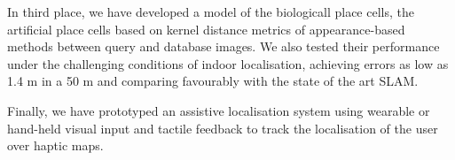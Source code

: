 In third place, we have developed a model of the biologicall place cells, the artificial place cells based on kernel distance metrics of appearance-based methods between query and database images. We also tested their performance under the challenging conditions of indoor localisation, achieving errors as low as 1.4 m in a 50 m and comparing favourably with the state of the art SLAM. 

Finally, we have prototyped an assistive localisation system using wearable or hand-held visual input and tactile feedback to track the localisation of the user over haptic maps.


\vfill



\endgroup			

\vfill